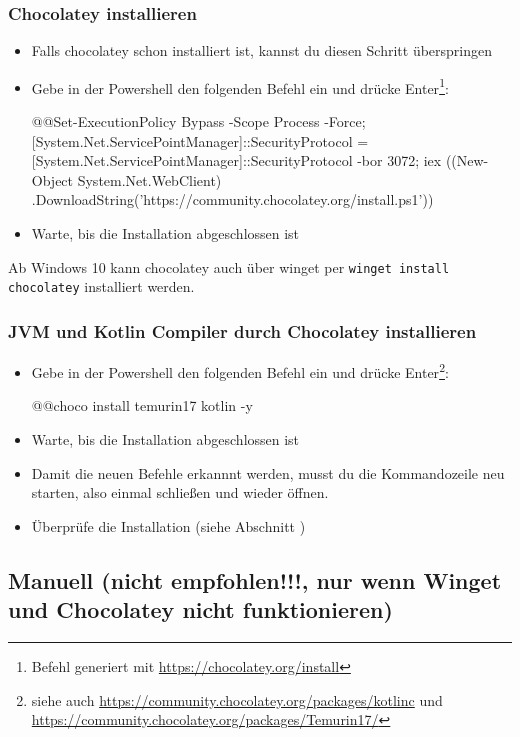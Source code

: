 \subsubsection*{Chocolatey installieren}
\begin{itemize}
    \item Falls chocolatey schon installiert ist, kannst du diesen Schritt überspringen
    \item Gebe in der Powershell den folgenden Befehl ein und drücke Enter\footnote{Befehl generiert mit \url{https://chocolatey.org/install}}:
        \begin{commandshell}
            @\shellprefix{}@Set-ExecutionPolicy Bypass -Scope Process -Force;
            [System.Net.ServicePointManager]::SecurityProtocol =
            [System.Net.ServicePointManager]::SecurityProtocol -bor 3072;
            iex ((New-Object System.Net.WebClient)
            .DownloadString('https://community.chocolatey.org/install.ps1'))
        \end{commandshell}
    \item Warte, bis die Installation abgeschlossen ist
\end{itemize}
\begin{hinweis}
    Ab Windows 10 kann chocolatey auch über winget per \texttt{winget install chocolatey} installiert werden.
\end{hinweis}
\subsubsection*{JVM und Kotlin Compiler durch Chocolatey installieren}
\begin{itemize}
    \item Gebe in der Powershell den folgenden Befehl ein und drücke Enter\footnote{siehe auch \url{https://community.chocolatey.org/packages/kotlinc} und \url{https://community.chocolatey.org/packages/Temurin17/}}:
        \begin{commandshell}
            @\shellprefix{}@choco install temurin17 kotlin -y
        \end{commandshell}
    \item Warte, bis die Installation abgeschlossen ist
    \item Damit die neuen Befehle erkannnt werden, musst du die Kommandozeile neu starten, also einmal schließen und wieder öffnen.
    \item Überprüfe die Installation (siehe Abschnitt )
\end{itemize}
\subsection*{Manuell (nicht empfohlen!!!, nur wenn Winget und Chocolatey nicht funktionieren)}
